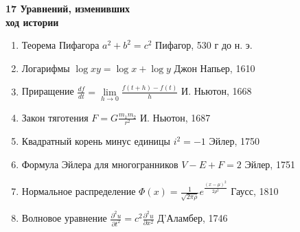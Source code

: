 \documentclass[12pt]{article}
\begin{document}
\begin{flushleft}
\textbf{\large{17 Уравнений, изменивших\\ ход истории}}
\end{flushleft}
\begin{enumerate}
\item \begin{minipage}[t]{100mm} 
 Теорема Пифагора                                  $a^2+b^2=c^2$
\hfill Пифагор, 530 г до н. э. \end{minipage} 

\item\begin{minipage}[t]{100mm} 
 Логарифмы                                              ${\log xy} = {\log x} + {\log y}$
\hfill Джон Напьер, 1610 \end{minipage} 

\item\begin{minipage}[t]{100mm} 
 Приращение                                            $ \frac{df}{dt} =\lim \limits_{h \to 0}\frac{f(t+h)-f(t)}{h}$
\hfill И. Ньютон, 1668 \end{minipage} 

\item\begin{minipage}[t]{100mm} 
 Закон тяготения                                     $F = G\frac{m_1 m_2}{r^2}$
\hfill И. Ньютон, 1687 \end{minipage} 
  
\item\begin{minipage}[t]{100mm} 
 Квадратный корень минус единицы     $i^2 = -1 $
\hfill Эйлер, 1750 \end{minipage} 

\item\begin{minipage}[t]{100mm} 
 Формула Эйлера для многогранников  $V - E + F = 2$
\hfill Эйлер, 1751 \end{minipage} 

\item\begin{minipage}[t]{100mm} 
 Нормальное распределение                  $\Phi(x) = \frac1{\sqrt{2\pi \rho}} e^{\frac{(x-\mu)^2}{2 \rho^2}}$
\hfill Гаусс, 1810 \end{minipage} 

\item\begin{minipage}[t]{100mm} 
 Волновое уравнение                              $\frac{\partial^2 u}{\partial t^2} = c^2\frac{\partial^2 u}{\partial x^2}$
\hfill Д'Аламбер, 1746 \end{minipage} 


\end{enumerate}
\end{document}
